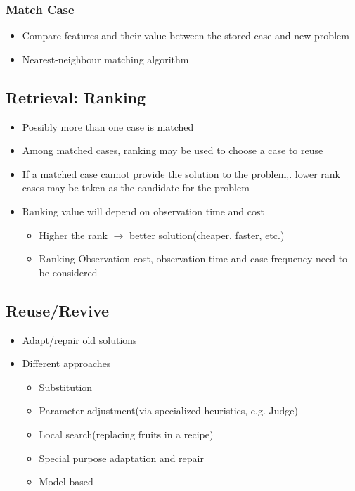 \subsubsection{Match Case}
\begin{itemize}
\item Compare features and their value between the stored case and new problem
\item Nearest-neighbour matching algorithm
\end{itemize}

\subsection{Retrieval: Ranking}
\begin{itemize}
\item Possibly more than one case is matched
\item Among matched cases, ranking may be used to choose a case to reuse
\item If a matched case cannot provide the solution to the problem,. lower rank cases may be taken as the candidate for the problem
\item Ranking value will depend on observation time and cost
\begin{itemize}
\item Higher the rank $\longrightarrow$ better solution(cheaper, faster, etc.)
\item Ranking Observation cost, observation time and case frequency need to be considered
\end{itemize}
\end{itemize}

\subsection{Reuse/Revive}
\begin{itemize}
\item Adapt/repair old solutions
\item Different approaches
\begin{itemize}
\item Substitution
\item Parameter adjustment(via specialized heuristics, e.g. Judge)
\item Local search(replacing fruits in a recipe)
\item Special purpose adaptation and repair
\item Model-based
\end{itemize}
\end{itemize}

